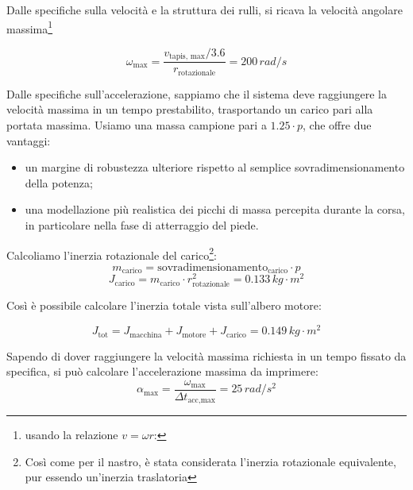 \documentclass[a4paper,12pt]{article}
\begin{document}
\vspace{0.5em}

Dalle specifiche sulla velocità e la struttura dei rulli, si ricava la velocità angolare massima\footnote{usando la relazione \( v = \omega r \):}

\[
    \omega_{\text{max}} = \frac{v_{\text{tapis, max}} / 3.6}{r_{\text{rotazionale}}} = 200 \,rad/s
\]

\vspace{0.5em}
 
Dalle specifiche sull'accelerazione, sappiamo che il sistema deve raggiungere la velocità massima in un tempo prestabilito, trasportando un carico pari alla portata massima. Usiamo una massa campione pari a \(1.25 \cdot p\), che offre due vantaggi:

\begin{itemize}
    \item un margine di robustezza ulteriore rispetto al semplice sovradimensionamento della potenza;
    \item una modellazione più realistica dei picchi di massa percepita durante la corsa, in particolare nella fase di atterraggio del piede.
\end{itemize}

\vspace{0.5em}

Calcoliamo l'inerzia rotazionale del carico\footnote{Così come per il nastro, è stata considerata l'inerzia rotazionale equivalente, pur essendo un'inerzia traslatoria}:
\[
    m_{\text{carico}} = \text{sovradimensionamento}_{\text{carico}} \cdot       p
\]
\[
    J_{\text{carico}} = m_{\text{carico}} \cdot r_{\text{rotazionale}}^2= 0.133 \, kg \cdot m^2
\]

\vspace{0.5em}

Così è possibile calcolare l'inerzia totale vista sull'albero motore:

\vspace{0.3em}

\[
    J_{\text{tot}} = J_{\text{macchina}} + J_{\text{motore}} + J_{\text{carico}} = 0.149\,kg \cdot m^2
\]

\vspace{0.5em}

Sapendo di dover raggiungere la velocità massima richiesta in un tempo fissato da specifica, si può calcolare l'accelerazione massima da imprimere:
\vspace{0.5em}
\[
    \alpha_{\text{max}} = \frac{\omega_{\text{max}}}{\Delta t_{\text{acc,max}}}=25 \, rad/s^2
\]
\end{document}
